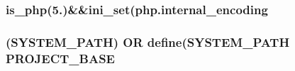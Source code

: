 \subsubsection[{is\+\_\+php}]{\setlength{\rightskip}{0pt plus 5cm}is\+\_\+php(\textquotesingle{}5.\textquotesingle{})\&\&ini\+\_\+set(\textquotesingle{}php.\+internal\+\_\+encoding\textquotesingle{}}\label{_bootstrap_8php_acbea7ca989439eea4c6019ad3c5161aa}
\hypertarget{_bootstrap_8php_a8731a5d504a6592ae43e07a048933c32}{}
\subsubsection[{P\+R\+O\+J\+E\+C\+T\+\_\+\+B\+A\+S\+E}]{ (\textquotesingle{}S\+Y\+S\+T\+E\+M\+\_\+\+P\+A\+T\+H\textquotesingle{}) O\+R define(\textquotesingle{}S\+Y\+S\+T\+E\+M\+\_\+\+P\+A\+T\+H\textquotesingle{} P\+R\+O\+J\+E\+C\+T\+\_\+\+B\+A\+S\+E}\label{_bootstrap_8php_a8731a5d504a6592ae43e07a048933c32}
